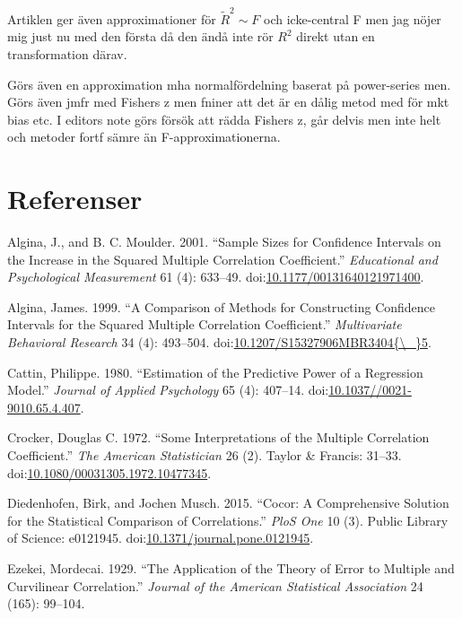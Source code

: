 \documentclass[]{article}
\begin{document}
Artiklen ger även approximationer för \(\tilde{R}^2 \sim F\) och
icke-central F men jag nöjer mig just nu med den första då den ändå inte
rör \(R^2\) direkt utan en transformation därav.

Görs även en approximation mha normalfördelning baserat på power-series
men. Görs även jmfr med Fishers z men fniner att det är en dålig metod
med för mkt bias etc. I editors note görs försök att rädda Fishers z,
går delvis men inte helt och metoder fortf sämre än F-approximationerna.

\section*{Referenser}\label{referenser}

\hypertarget{refs}{}
\hypertarget{ref-Algina2001}{}
Algina, J., and B. C. Moulder. 2001. ``Sample Sizes for Confidence
Intervals on the Increase in the Squared Multiple Correlation
Coefficient.'' \emph{Educational and Psychological Measurement} 61 (4):
633--49.
doi:\href{https://doi.org/10.1177/00131640121971400}{10.1177/00131640121971400}.

\hypertarget{ref-Algina1999}{}
Algina, James. 1999. ``A Comparison of Methods for Constructing
Confidence Intervals for the Squared Multiple Correlation Coefficient.''
\emph{Multivariate Behavioral Research} 34 (4): 493--504.
doi:\href{https://doi.org/10.1207/S15327906MBR3404\%7B/_\%7D5}{10.1207/S15327906MBR3404\{\textbackslash{}\_\}5}.

\hypertarget{ref-Cattin1980}{}
Cattin, Philippe. 1980. ``Estimation of the Predictive Power of a
Regression Model.'' \emph{Journal of Applied Psychology} 65 (4):
407--14.
doi:\href{https://doi.org/10.1037//0021-9010.65.4.407}{10.1037//0021-9010.65.4.407}.

\hypertarget{ref-Crocker1972}{}
Crocker, Douglas C. 1972. ``Some Interpretations of the Multiple
Correlation Coefficient.'' \emph{The American Statistician} 26 (2).
Taylor \& Francis: 31--33.
doi:\href{https://doi.org/10.1080/00031305.1972.10477345}{10.1080/00031305.1972.10477345}.

\hypertarget{ref-Diedenhofen2015}{}
Diedenhofen, Birk, and Jochen Musch. 2015. ``Cocor: A Comprehensive
Solution for the Statistical Comparison of Correlations.'' \emph{PloS
One} 10 (3). Public Library of Science: e0121945.
doi:\href{https://doi.org/10.1371/journal.pone.0121945}{10.1371/journal.pone.0121945}.

\hypertarget{ref-Ezekei1929}{}
Ezekei, Mordecai. 1929. ``The Application of the Theory of Error to
Multiple and Curvilinear Correlation.'' \emph{Journal of the American
Statistical Association} 24 (165): 99--104.
\end{document}
